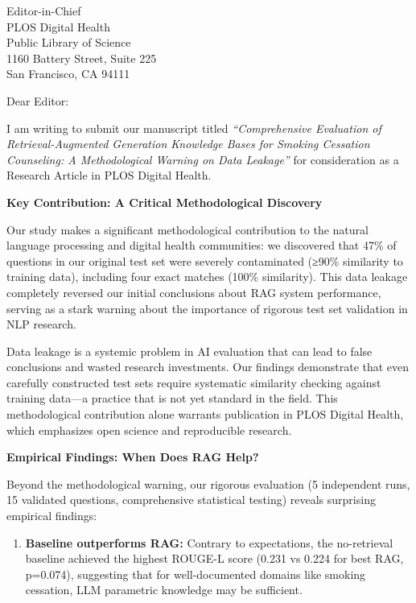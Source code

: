 \documentclass[11pt]{letter}
\begin{document}
\begin{letter}{%
Editor-in-Chief\\
PLOS Digital Health\\
Public Library of Science\\
1160 Battery Street, Suite 225\\
San Francisco, CA 94111}

\opening{Dear Editor:}

I am writing to submit our manuscript titled \textit{``Comprehensive Evaluation of Retrieval-Augmented Generation Knowledge Bases for Smoking Cessation Counseling: A Methodological Warning on Data Leakage''} for consideration as a Research Article in PLOS Digital Health.

\textbf{Key Contribution: A Critical Methodological Discovery}

Our study makes a significant methodological contribution to the natural language processing and digital health communities: we discovered that 47\% of questions in our original test set were severely contaminated (≥90\% similarity to training data), including four exact matches (100\% similarity). This data leakage completely reversed our initial conclusions about RAG system performance, serving as a stark warning about the importance of rigorous test set validation in NLP research.

Data leakage is a systemic problem in AI evaluation that can lead to false conclusions and wasted research investments. Our findings demonstrate that even carefully constructed test sets require systematic similarity checking against training data—a practice that is not yet standard in the field. This methodological contribution alone warrants publication in PLOS Digital Health, which emphasizes open science and reproducible research.

\textbf{Empirical Findings: When Does RAG Help?}

Beyond the methodological warning, our rigorous evaluation (5 independent runs, 15 validated questions, comprehensive statistical testing) reveals surprising empirical findings:

\begin{enumerate}
    \item \textbf{Baseline outperforms RAG:} Contrary to expectations, the no-retrieval baseline achieved the highest ROUGE-L score (0.231 vs 0.224 for best RAG, p=0.074), suggesting that for well-documented domains like smoking cessation, LLM parametric knowledge may be sufficient.


\end{enumerate}
\end{letter}
\end{document}
